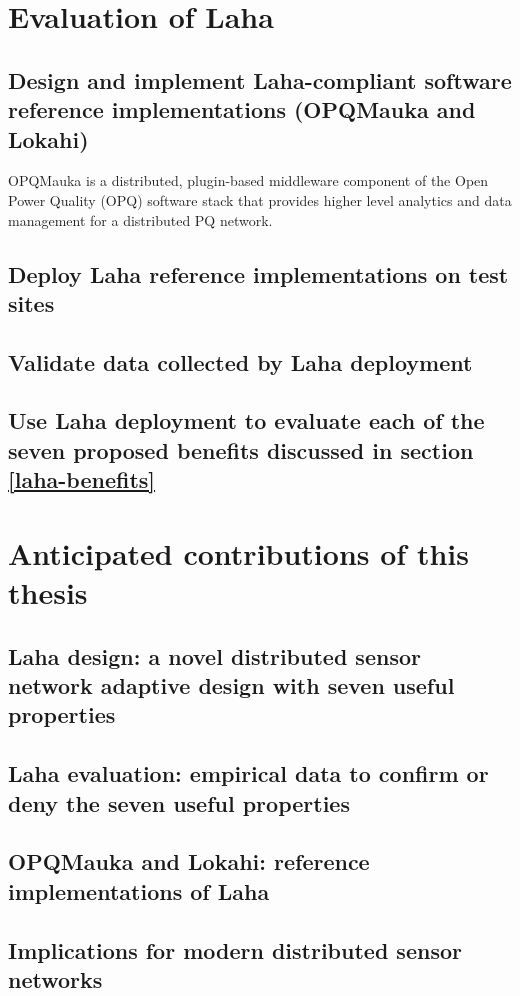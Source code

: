 \section{Evaluation of Laha}
\subsection{Design and implement Laha-compliant software reference implementations (OPQMauka and Lokahi)}
OPQMauka is a distributed, plugin-based middleware component of the Open Power Quality (OPQ) software stack that provides higher level analytics and data management for a distributed PQ network.

\subsection{Deploy Laha reference implementations on test sites}
\subsection{Validate data collected by Laha deployment}
\subsection{Use Laha deployment to evaluate each of the seven proposed benefits discussed in section \ref{laha-benefits}}

\section{Anticipated contributions of this thesis}
\subsection{Laha design: a novel distributed sensor network adaptive design with seven useful properties}
\subsection{Laha evaluation: empirical data to confirm or deny the seven useful properties}
\subsection{OPQMauka and Lokahi: reference implementations of Laha}
\subsection{Implications for modern distributed sensor networks}

